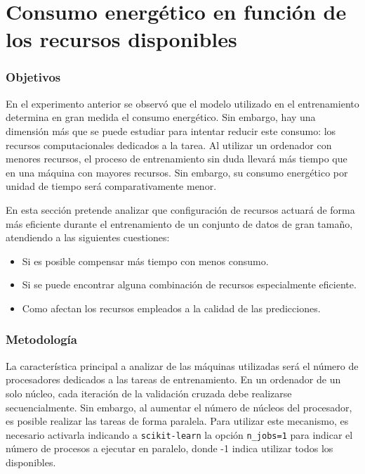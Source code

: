 

\section{Consumo energético en función de los recursos disponibles}
\label{sec:test-2-resources}

\subsubsection{Objetivos}

 En el experimento anterior se observó que el modelo utilizado en el entrenamiento determina en gran medida el consumo energético. Sin embargo, hay una dimensión más que se puede estudiar para intentar reducir este consumo: los recursos computacionales dedicados a la tarea. Al utilizar un ordenador con menores recursos, el proceso de entrenamiento sin duda llevará más tiempo que en una máquina con mayores recursos. Sin embargo, su consumo energético por unidad de tiempo será comparativamente menor.
 
 En esta sección pretende analizar que configuración de recursos actuará de forma más eficiente durante el entrenamiento de un conjunto de datos de gran tamaño, atendiendo a las siguientes cuestiones:

 \begin{itemize}
    \item Si es posible compensar más tiempo con menos consumo.
    \item Si se puede encontrar alguna combinación de recursos especialmente eficiente.
    \item Como afectan los recursos empleados a la calidad de las predicciones.
\end{itemize}

\subsubsection{Metodología}

La característica principal a analizar de las máquinas utilizadas será el número de procesadores dedicados a las tareas de entrenamiento. En un ordenador de un solo núcleo, cada iteración de la validación cruzada debe realizarse secuencialmente. Sin embargo, al aumentar el número de núcleos del procesador, es posible realizar las tareas de forma paralela. Para utilizar este mecanismo, es necesario activarla indicando a \texttt{scikit-learn} la opción \texttt{n\_jobs=1} para indicar el número de procesos a ejecutar en paralelo, donde -1 indica utilizar todos los disponibles.

